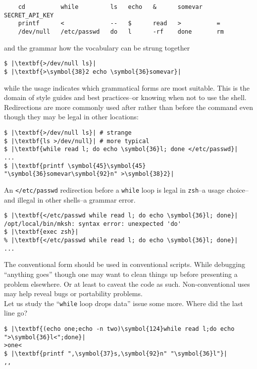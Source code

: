 \documentclass[10pt,a4paper]{article}
\begin{document}
\begin{lstlisting}
    cd          while         ls   echo   &      somevar    SECRET_API_KEY
    printf      <             --   $      read   >          =
    /dev/null   /etc/passwd   do   l      -rf    done       rm
\end{lstlisting}

and the grammar how the vocabulary can be strung together

\begin{lstlisting}
$ |\textbf{>/dev/null ls}|
$ |\textbf{>\symbol{38}2 echo \symbol{36}somevar}|
\end{lstlisting}

while the usage indicates which grammatical forms are most suitable.
This is the domain of style guides and best practices--or knowing when
not to use the shell. Redirections are more commonly used after rather
than before the command even though they may be legal in other
locations:

\begin{lstlisting}
$ |\textbf{>/dev/null ls}| # strange
$ |\textbf{ls >/dev/null}| # more typical
$ |\textbf{while read l; do echo \symbol{36}l; done </etc/passwd}|
...
$ |\textbf{printf \symbol{45}\symbol{45} "\symbol{36}somevar\symbol{92}n" >\symbol{38}2}|
\end{lstlisting}

An \texttt{</etc/passwd} redirection before a \texttt{while} loop is
legal in \texttt{zsh}--a usage choice--and illegal in other shells--a
grammar error.

\begin{lstlisting}
$ |\textbf{</etc/passwd while read l; do echo \symbol{36}l; done}|
/opt/local/bin/mksh: syntax error: unexpected 'do'
$ |\textbf{exec zsh}|
% |\textbf{</etc/passwd while read l; do echo \symbol{36}l; done}|
...
\end{lstlisting}

The conventional form should be used in conventional scripts. While
debugging ``anything goes'' though one may want to clean things up
before presenting a problem elsewhere. Or at least to caveat the
code as such. Non-conventional uses may help reveal bugs or
portability problems. \\

Let us study the ``\texttt{while} loop drops data'' issue some more.
Where did the last line go?

\begin{lstlisting}
$ |\textbf{(echo one;echo -n two)\symbol{124}while read l;do echo ">\symbol{36}l<";done}|
>one<
$ |\textbf{printf ",\symbol{37}s,\symbol{92}n" "\symbol{36}l"}|
,,
\end{lstlisting}
\end{document}
